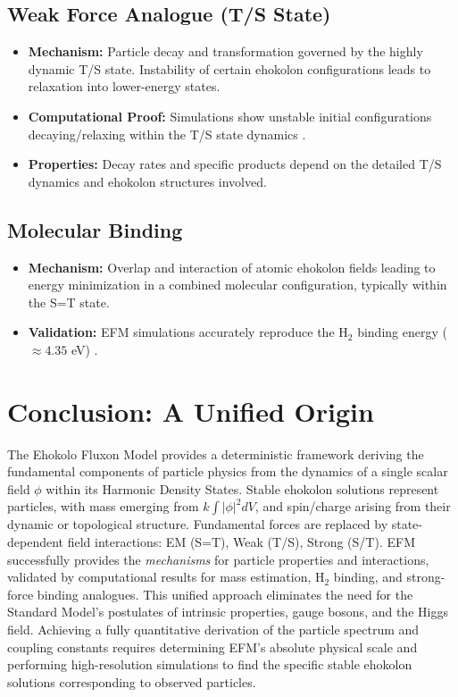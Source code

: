 \documentclass[11pt]{article}
\begin{document}
\subsection{Weak Force Analogue (T/S State)}
\begin{itemize}
    \item \textbf{Mechanism: } Particle decay and transformation governed by the highly dynamic T/S state. Instability of certain ehokolon configurations leads to relaxation into lower-energy states.
    \item \textbf{Computational Proof: } Simulations show unstable initial configurations decaying/relaxing within the T/S state dynamics \cite{Previous_Analysis_Placeholder}.
    \item \textbf{Properties: } Decay rates and specific products depend on the detailed T/S dynamics and ehokolon structures involved.
\end{itemize}

\subsection{Molecular Binding}
\begin{itemize}
    \item \textbf{Mechanism: } Overlap and interaction of atomic ehokolon fields leading to energy minimization in a combined molecular configuration, typically within the S=T state.
    \item \textbf{Validation: } EFM simulations accurately reproduce the H\(_2\) binding energy (\(\approx 4.35\) eV) \cite{EFM_Matter_Formation_2}.
\end{itemize}

\section{Conclusion: A Unified Origin}
The Ehokolo Fluxon Model provides a deterministic framework deriving the fundamental components of particle physics from the dynamics of a single scalar field \(\phi\) within its Harmonic Density States. Stable ehokolon solutions represent particles, with mass emerging from \(k\int |\phi|^2 dV\), and spin/charge arising from their dynamic or topological structure. Fundamental forces are replaced by state-dependent field interactions: EM (S=T), Weak (T/S), Strong (S/T). EFM successfully provides the \textit{mechanisms} for particle properties and interactions, validated by computational results for mass estimation, H\(_2\) binding, and strong-force binding analogues. This unified approach eliminates the need for the Standard Model's postulates of intrinsic properties, gauge bosons, and the Higgs field. Achieving a fully quantitative derivation of the particle spectrum and coupling constants requires determining EFM's absolute physical scale and performing high-resolution simulations to find the specific stable ehokolon solutions corresponding to observed particles.
\end{document}
